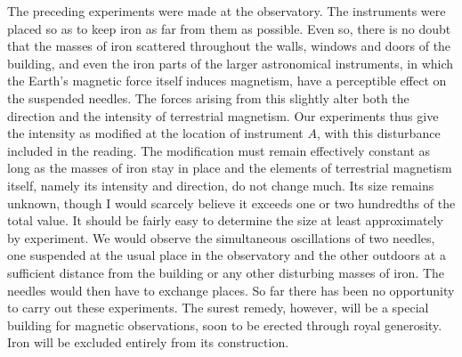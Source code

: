 The preceding experiments were made at the observatory. The instruments were placed so as to keep iron as far from them as possible. Even so, there is no doubt that the masses of iron scattered throughout the walls, windows and doors of the building, and even the iron parts of the larger astronomical instruments, in which the Earth's magnetic force itself induces magnetism, have a perceptible effect on the suspended needles. The forces arising from this slightly alter both the direction and the intensity of terrestrial magnetism. Our experiments thus give the intensity as modified at the location of instrument $A$, with this disturbance included in the reading. The modification must remain effectively constant as long as the masses of iron stay in place and the elements of terrestrial magnetism itself, namely its intensity and direction, do not change much. Its size remains unknown, though I would scarcely believe it exceeds one or two hundredths of the total value. It should be fairly easy to determine the size at least approximately by experiment. We would observe the simultaneous oscillations of two needles, one suspended at the usual place in the observatory and the other outdoors at a sufficient distance from the building or any other disturbing masses of iron. The needles would then have to exchange places. So far there has been no opportunity to carry out these experiments. The surest remedy, however, will be a special building for magnetic observations, soon to be erected through royal generosity. Iron will be excluded entirely from its construction.

